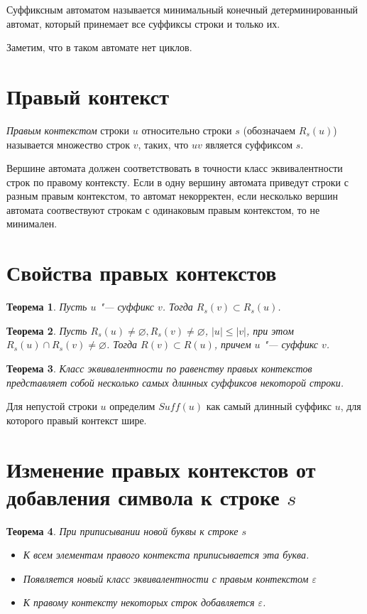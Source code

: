 \documentclass[12pt,a4paper]{article}
\renewcommand{\le}{\leqslant}
\theoremstyle{plain}
\newtheorem{thm}{Теорема}
\begin{document}
Суффиксным автоматом называется минимальный конечный детерминированный автомат, который
принемает все суффиксы строки и только их.

Заметим, что в таком автомате нет циклов.

\section{Правый контекст}

{\it Правым контекстом} строки $u$ относительно строки $s$ (обозначаем $R_s(u)$) называется множество строк $v$, таких, что
$uv$ является суффиксом $s$.

Вершине автомата должен соответствовать в точности класс эквивалентности строк по правому контексту.
Если в одну вершину автомата приведут строки с разным правым контекстом, то автомат некорректен,
если несколько вершин автомата соотвествуют строкам с одинаковым правым контекстом, то не минимален.

\section{Свойства правых контекстов}
          
\begin{thm}
Пусть $u$ "--- суффикс $v$. Тогда $R_s(v) \subset R_s(u)$. 
\end{thm}

\begin{thm}
Пусть $R_s(u) \neq \varnothing, R_s(v) \neq \varnothing$, $|u| \le |v|$, при этом $R_s(u) \cap R_s(v) \neq \varnothing$. Тогда
$R(v) \subset R(u)$, причем $u$ "--- суффикс $v$.
\end{thm}

\begin{thm}
Класс эквивалентности по равенству правых контекстов представляет собой
несколько самых длинных суффиксов некоторой строки.
\end{thm}

Для непустой строки $u$ определим $Suff(u)$ как самый длинный суффикс $u$, для которого 
правый контекст шире.

\section{Изменение правых контекстов от добавления символа к строке $s$}

\begin{thm}
При приписывании новой буквы к строке $s$
\begin{itemize}
\item К всем элементам правого контекста приписывается эта буква.
\item Появляется новый класс эквивалентности с правым контекстом $\varepsilon$
\item К правому контексту некоторых строк добавляется $\varepsilon$.
\end{itemize}
\end{thm}
\end{document}
